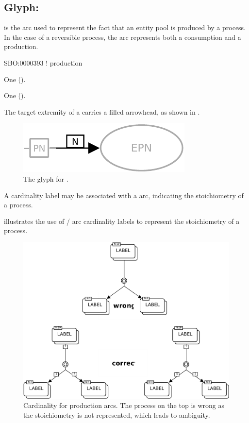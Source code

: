 \subsection{Glyph: }
\label{sec:production}

 is the arc used to represent the fact that an entity pool is produced by a process. In the case of a reversible process, the  arc represents both a consumption and a production.

\begin{glyphDescription}

\glyphSboTerm
SBO:0000393 ! production

\glyphOrigin
One  ().

\glyphTarget
One  ().

\glyphSymbol
The target extremity of a  carries a filled arrowhead, as shown in .

\end{glyphDescription}

\begin{figure}[H]
  \centering
  \includegraphics{images/build/production.pdf}
  \caption{The \PD glyph for .}
  \label{fig:production}
\end{figure}

A cardinality label may be associated with a  arc, indicating the stoichiometry of a process.

 illustrates the use of / arc cardinality labels to represent the stoichiometry of a process.

\begin{figure}[H]
  \centering
  \includegraphics[scale = 0.6]{images/build/stoich_ex1_example.pdf}
  \caption{Cardinality for production arcs.
  The process on the top is wrong as the stoichiometry is not represented, which leads to ambiguity.}
  \label{fig:prod-card}
\end{figure}
